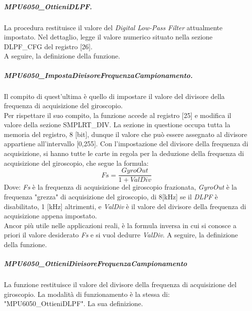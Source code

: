 \documentclass[11pt]{report}
\begin{document}
\subparagraph{MPU6050\_OttieniDLPF.} 
La procedura restituisce il valore del \textit{Digital Low-Pass Filter} attualmente impostato. Nel dettaglio, legge il valore numerico situato nella sezione\\
DLPF\_CFG del registro [26].\\
A seguire, la definizione della funzione.


\subparagraph{MPU6050\_ImpostaDivisoreFrequenzaCampionamento.}
Il compito di quest'ultima è quello di impostare il valore del divisore della frequenza di acquisizione del giroscopio.\\
Per rispettare il suo compito, la funzione accede al registro [25] e modifica il valore della sezione SMPLRT\_DIV. La sezione in questione occupa tutta la memoria del registro, 8 [bit], dunque il valore che può essere assegnato al divisore appartiene all'intervallo [0,255].
Con l'impostazione del divisore della frequenza di acquisizione, si hanno tutte le carte in regola per la deduzione della frequenza di acquisizione del giroscopio, che segue la formula:
\begin{equation}
    Fs = \frac{GyroOut}{1 + ValDiv}
\end{equation}
Dove: \textit{Fs} è la frequenza di acquisizione del giroscopio frazionata, \textit{GyroOut} è la frequenza "grezza" di acquisizione del giroscopio, di 8[kHz] se il \textit{DLPF} è disabilitato, 1 [kHz] altrimenti, e \textit{ValDiv} è il valore del divisore della frequenza di acquisizione appena impostato.\\
Ancor più utile nelle applicazioni reali, è la formula inversa in cui si conosce a priori il valore desiderato \textit{Fs} e si vuol dedurre \textit{ValDiv}.
A seguire, la definizione della funzione.


\subparagraph{MPU6050\_OttieniDivisoreFrequenzaCampionamento}
La funzione restituisce il valore del divisore della frequenza di acquisizione del giroscopio. La modalità di funzionamento è la stessa di: "MPU6050\_OttieniDLPF".
La sua definizione.

\end{document}
